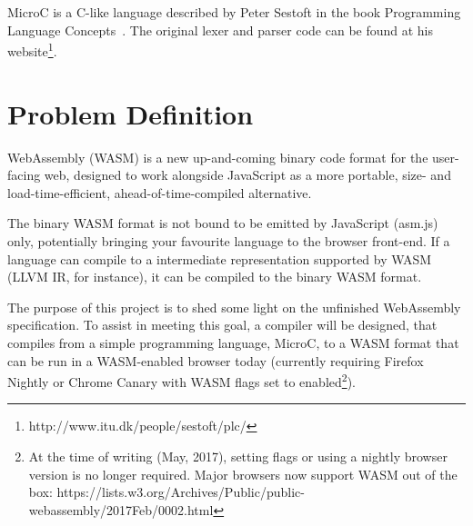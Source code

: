 \documentclass[a4paper]{article}
\begin{document}
MicroC is a C-like language described by Peter Sestoft in the book Programming Language Concepts~\cite{PLC}. The original lexer and parser code can be found at his website\footnote{http://www.itu.dk/people/sestoft/plc/}.

\section{Problem Definition} %
WebAssembly (WASM) is a new up-and-coming binary code format for the user-facing web, designed to work alongside JavaScript as a more portable, size- and load-time-efficient, ahead-of-time-compiled alternative. 

The binary WASM format is not bound to be emitted by JavaScript (asm.js) only, potentially bringing your favourite language to the browser front-end. If a language can compile to a intermediate representation supported by WASM (LLVM IR, for instance), it can be compiled to the binary WASM format. 

The purpose of this project is to shed some light on the unfinished WebAssembly specification. To assist in meeting this goal, a compiler will be designed, that compiles from a simple programming language, MicroC, to a WASM format that can be run in a WASM-enabled browser today (currently requiring Firefox Nightly or Chrome Canary with WASM flags set to enabled\footnote{At the time of writing (May, 2017), setting flags or using a nightly browser version is no longer required. Major browsers now support WASM out of the box: https://lists.w3.org/Archives/Public/public-webassembly/2017Feb/0002.html}).
\end{document}
